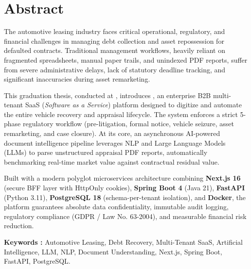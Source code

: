 \newpage

\chapter*{Abstract}

The automotive leasing industry faces critical operational, regulatory, and financial challenges in managing debt collection and asset repossession for defaulted contracts. Traditional management workflows, heavily reliant on fragmented spreadsheets, manual paper trails, and unindexed PDF reports, suffer from severe administrative delays, lack of statutory deadline tracking, and significant inaccuracies during asset remarketing.

This graduation thesis, conducted at \textbf{\hostCompany}, introduces \textbf{\projectShortTitle}, an enterprise B2B multi-tenant SaaS (\textit{Software as a Service}) platform designed to digitize and automate the entire vehicle recovery and appraisal lifecycle. The system enforces a strict 5-phase regulatory workflow (pre-litigation, formal notice, vehicle seizure, asset remarketing, and case closure). At its core, an asynchronous AI-powered document intelligence pipeline leverages NLP and Large Language Models (LLMs) to parse unstructured appraisal PDF reports, automatically benchmarking real-time market value against contractual residual value.

Built with a modern polyglot microservices architecture combining \textbf{Next.js 16} (secure BFF layer with HttpOnly cookies), \textbf{Spring Boot 4} (Java 21), \textbf{FastAPI} (Python 3.11), \textbf{PostgreSQL 18} (schema-per-tenant isolation), and \textbf{Docker}, the platform guarantees absolute data confidentiality, immutable audit logging, regulatory compliance (GDPR / Law No. 63-2004), and measurable financial risk reduction.

\vspace{0.8cm}
\noindent\textbf{Keywords :} Automotive Leasing, Debt Recovery, Multi-Tenant SaaS, Artificial Intelligence, LLM, NLP, Document Understanding, Next.js, Spring Boot, FastAPI, PostgreSQL.
